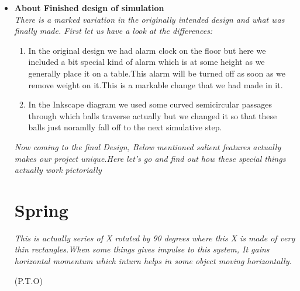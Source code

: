 \documentclass[a4paper]{article}
\begin{document}
	\begin{flushleft}
	\begin{itemize}
	\item{\LARGE \textbf{About Finished design of simulation}}\\
	\vspace{2mm}
	\large\textit{There is a marked variation in the originally intended design and what was finally made. First let us have a look at the differences: 
	} \\
	\begin{enumerate}
	\item \large{In the original design we had alarm clock on the floor but here we included a bit special kind of alarm which is at some height as we generally place it on a table.This alarm will be turned off as soon as we remove weight on it.This is a markable change that we had made in it.}
	
	\item \large{In the Inkscape diagram we used some curved semicircular passages through which balls traverse actually but we changed it so that these balls just noramlly fall off to the next simulative step.}
	\end{enumerate}
	\vspace{10pt}
	
	
					
	
	\large \textit{Now coming to the final Design, Below mentioned salient features actually makes our project unique.Here let's go and find out how these special things actually work pictorially}
	
	\section{Spring}

	\large\textit{This is actually series of X rotated by 90 degrees where this X is made of very thin rectangles.When some things gives impulse to this system, It gains horizontal momentum which inturn helps in some object moving horizontally.}
	
	\hspace{350pt} \large{(P.T.O)}
	


\end{itemize}
\end{flushleft}
\end{document}
